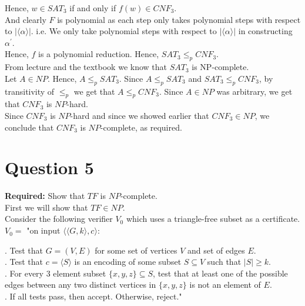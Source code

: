 \documentclass[12pt]{article}
\begin{document}
Hence, $w \in SAT_3$ if and only if $f(w) \in CNF_3$. \\

And clearly $F$ is polynomial as each step only takes polynomial steps with respect to $|\langle \alpha \rangle|$. i.e. We only take polynomial steps with respect to $|\langle \alpha \rangle|$ in constructing $\alpha^\prime$. \\
 
Hence, $f$ is a polynomial reduction. Hence, $SAT_3 \leq_p CNF_3$. \\

From lecture and the textbook we know that $SAT_3$ is NP-complete. \\

Let $A \in NP$. Hence, $A \leq_p SAT_3$. Since $A \leq_p SAT_3$ and $SAT_3 \leq_p CNF_3$, by transitivity of $\leq_p$ we get that $A \leq_p CNF_3$. Since $A \in NP$ was arbitrary, we get that $CNF_3$ is $NP$-hard. \\

Since $CNF_3$ is $NP$-hard and since we showed earlier that $CNF_3 \in NP$, we conclude that $CNF_3$ is $NP$-complete, as required. 

\newpage

\section*{Question 5}

\textbf{Required:} Show that $TF$ is $NP$-complete. \\

First we will show that $TF \in NP$. \\

Consider the following verifier $V_0$ which uses a triangle-free subset as a certificate. \\

$V_0 = $ "on input $\langle \langle G, k \rangle, c \rangle$: \\

\setlength\parindent{15pt}

. Test that $G = (V, E)$ for some set of vertices $V$ and set of edges $E$. \\
. Test that $c = \langle S \rangle$ is an encoding of some subset $S \subseteq V$ such that $|S| \geq k$. \\
. For every 3 element subset $\{x,y,z\} \subseteq S$, test that at least one of the possible edges between any two distinct vertices in $\{x,y,z\}$ is not an element of $E$. \\
. If all tests pass, then accept. Otherwise, reject." \\
\setlength\parindent{0pt}
\end{document}
